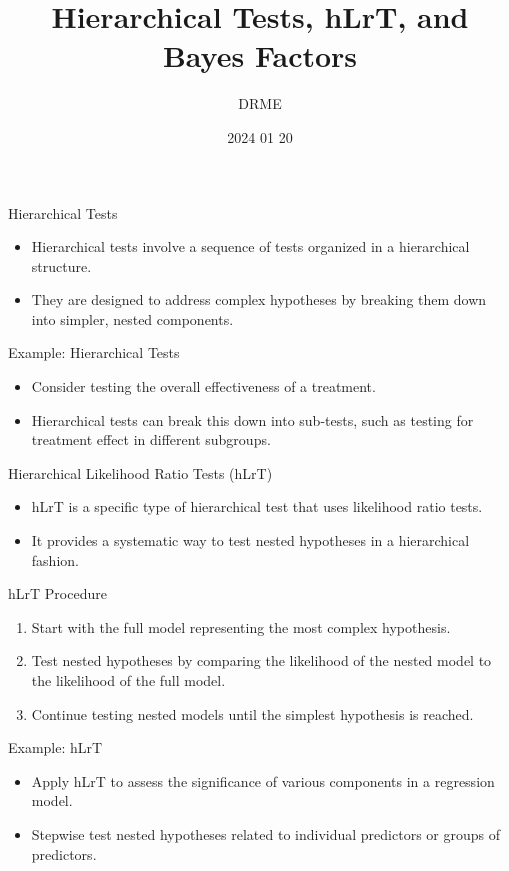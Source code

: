 \documentclass{beamer}
\title{Hierarchical Tests, hLrT, and Bayes Factors}
\author{DRME}
\date{2024 01 20}
\begin{document}
\begin{frame}
  \titlepage
\end{frame}

\begin{frame}{Hierarchical Tests}
  \begin{itemize}
    \item Hierarchical tests involve a sequence of tests organized in a hierarchical structure.
    \item They are designed to address complex hypotheses by breaking them down into simpler, nested components.
  \end{itemize}
\end{frame}

\begin{frame}{Example: Hierarchical Tests}
  \begin{itemize}
    \item Consider testing the overall effectiveness of a treatment.
    \item Hierarchical tests can break this down into sub-tests, such as testing for treatment effect in different subgroups.
  \end{itemize}
\end{frame}

\begin{frame}{Hierarchical Likelihood Ratio Tests (hLrT)}
  \begin{itemize}
    \item hLrT is a specific type of hierarchical test that uses likelihood ratio tests.
    \item It provides a systematic way to test nested hypotheses in a hierarchical fashion.
  \end{itemize}
\end{frame}

\begin{frame}{hLrT Procedure}
  \begin{enumerate}
    \item Start with the full model representing the most complex hypothesis.
    \item Test nested hypotheses by comparing the likelihood of the nested model to the likelihood of the full model.
    \item Continue testing nested models until the simplest hypothesis is reached.
  \end{enumerate}
\end{frame}

\begin{frame}{Example: hLrT}
  \begin{itemize}
    \item Apply hLrT to assess the significance of various components in a regression model.
    \item Stepwise test nested hypotheses related to individual predictors or groups of predictors.
  \end{itemize}
\end{frame}
\end{document}
